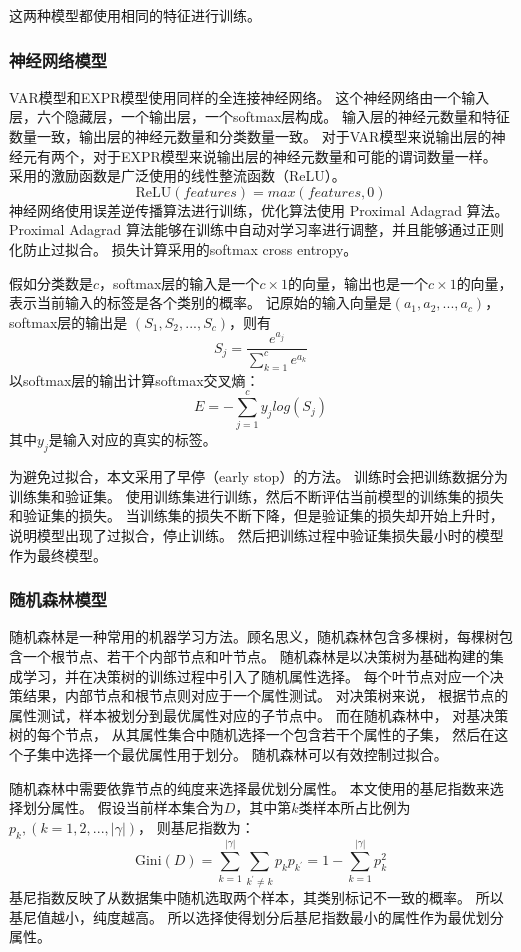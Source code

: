 这两种模型都使用相同的特征进行训练。

\subsubsection{神经网络模型}

VAR模型和EXPR模型使用同样的全连接神经网络。
这个神经网络由一个输入层，六个隐藏层，一个输出层，一个softmax层构成。
输入层的神经元数量和特征数量一致，输出层的神经元数量和分类数量一致。
对于VAR模型来说输出层的神经元有两个，对于EXPR模型来说输出层的神经元数量和可能的谓词数量一样。
采用的激励函数是广泛使用的线性整流函数（ReLU）。
$$
\mathrm{ReLU}(features) = max(features, 0)
$$
神经网络使用误差逆传播算法进行训练，优化算法使用 Proximal Adagrad 算法。
Proximal Adagrad 算法能够在训练中自动对学习率进行调整，并且能够通过正则化防止过拟合。
损失计算采用的softmax cross entropy。

假如分类数是$c$，softmax层的输入是一个$c \times 1$的向量，输出也是一个$c \times 1$的向量，
表示当前输入的标签是各个类别的概率。
记原始的输入向量是$(a_1, a_2, ..., a_c)$，softmax层的输出是
$(S_1, S_2, ..., S_c)$，则有
$$
S_j = \frac{e^{a_j}}{\sum_{k=1}^c{e^{a_k}}}
$$
以softmax层的输出计算softmax交叉熵：
$$
E = -\sum_{j = 1}^{c}{y_jlog(S_j)}
$$
其中$y_j$是输入对应的真实的标签。

为避免过拟合，本文采用了早停（early stop）的方法。
训练时会把训练数据分为训练集和验证集。
使用训练集进行训练，然后不断评估当前模型的训练集的损失和验证集的损失。
当训练集的损失不断下降，但是验证集的损失却开始上升时，
说明模型出现了过拟合，停止训练。
然后把训练过程中验证集损失最小时的模型作为最终模型。

\subsubsection{随机森林模型}

随机森林是一种常用的机器学习方法。顾名思义，随机森林包含多棵树，每棵树包含一个根节点、若干个内部节点和叶节点。
随机森林是以决策树为基础构建的集成学习，并在决策树的训练过程中引入了随机属性选择。
每个叶节点对应一个决策结果，内部节点和根节点则对应于一个属性测试。
对决策树来说，
根据节点的属性测试，样本被划分到最优属性对应的子节点中。
而在随机森林中，
对基决策树的每个节点，
从其属性集合中随机选择一个包含若干个属性的子集，
然后在这个子集中选择一个最优属性用于划分。
随机森林可以有效控制过拟合。

随机森林中需要依靠节点的纯度来选择最优划分属性。
本文使用的基尼指数来选择划分属性。
假设当前样本集合为$D$，其中第$k$类样本所占比例为$p_k,(k=1,2,...,|\gamma|)$，
则基尼指数为：
$$
\mathrm{Gini}(D) = \sum_{k=1}^{|\gamma|}{\sum_{k^\prime \ne k}{p_kp_{k^\prime}}} = 1 - \sum_{k = 1}^{|\gamma|}p_k^2
$$
基尼指数反映了从数据集中随机选取两个样本，其类别标记不一致的概率。
所以基尼值越小，纯度越高。
所以选择使得划分后基尼指数最小的属性作为最优划分属性。

